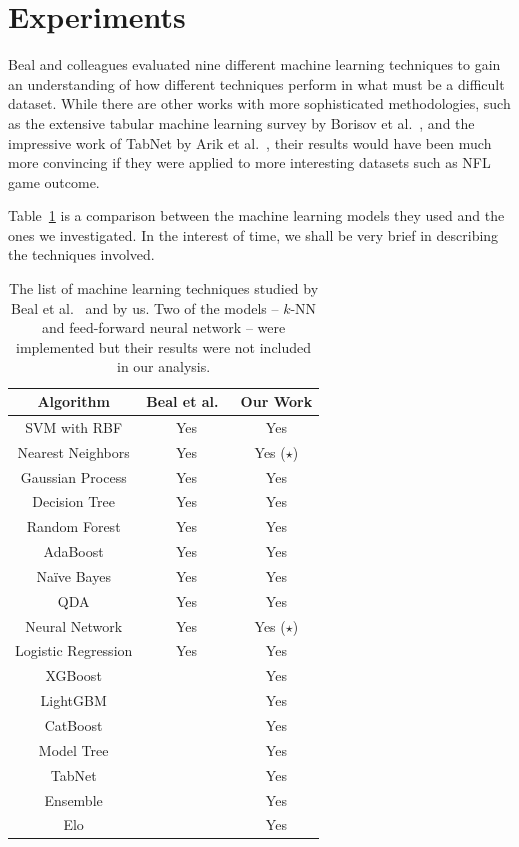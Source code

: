 \documentclass[10pt]{article}
\begin{document}
\section{Experiments}

Beal and colleagues evaluated nine different machine learning
techniques to gain an understanding of how different techniques perform in
what must be a difficult dataset. While there are other works with more
sophisticated methodologies, such as the extensive tabular machine learning survey by
Borisov et al.~\cite{borisov2022deep}, and the impressive work of TabNet by
Arik et al.~\cite{arik2021tabnet}, their results would have been much more convincing
if they were applied to more interesting datasets such as NFL game outcome.

Table~\ref{table:comparison}
is a comparison between the machine learning models they used and the
ones we investigated. In the interest of time, we shall be very brief in describing the
techniques involved.

\begin{table}[htbp]
\centering
\begin{tabular}{|c|c|c|}
\hline
Algorithm & Beal et al.~\cite{BeNo2020} & Our Work \\ \hline
SVM with RBF & Yes & Yes \\
Nearest Neighbors & Yes & Yes ($\star$) \\
Gaussian Process & Yes & Yes \\
Decision Tree & Yes & Yes \\
Random Forest & Yes & Yes \\
AdaBoost & Yes & Yes \\
Na\"ive Bayes & Yes & Yes \\
QDA & Yes & Yes \\
Neural Network & Yes & Yes ($\star$) \\
\rowcolor{Gray}
Logistic Regression & Yes & Yes \\ \hline
XGBoost &  & Yes \\
LightGBM &  & Yes \\
CatBoost &  & Yes \\
Model Tree &  & Yes \\
TabNet &  & Yes \\
Ensemble &  & Yes \\
Elo &  & Yes \\ \hline
\end{tabular}
\caption{The list of machine learning techniques studied by Beal et al.~\cite{BeNo2020}
and by us. Two of the models -- $k$-NN and feed-forward neural network -- were implemented
but their results were not included in our analysis.}
\label{table:comparison}
\end{table}
\end{document}
